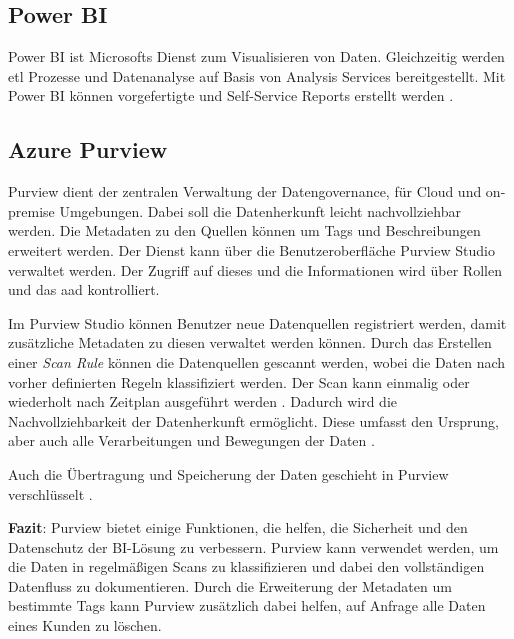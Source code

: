 \subsection{Power BI} \label{sec:grundlagen:azure_dienste:powerBI}
Power BI ist Microsofts Dienst zum Visualisieren von Daten. Gleichzeitig werden \ac{etl} Prozesse und Datenanalyse auf Basis von Analysis Services bereitgestellt. Mit Power BI können vorgefertigte und Self-Service Reports erstellt werden \cite{how_beyond_2020}.

\subsection{Azure Purview} \label{sec:grundlagen:azure_dienste:purview}
Purview dient der zentralen Verwaltung der Datengovernance, für Cloud und on-premise Umgebungen. Dabei soll die Datenherkunft leicht nachvollziehbar werden. Die Metadaten zu den Quellen können um Tags und Beschreibungen erweitert werden. Der Dienst kann über die Benutzeroberfläche Purview Studio verwaltet werden. Der Zugriff auf dieses und die Informationen wird über Rollen und das \ac{aad} kontrolliert.

Im Purview Studio können Benutzer neue Datenquellen registriert werden, damit zusätzliche Metadaten zu diesen verwaltet werden können. Durch das Erstellen einer \textit{Scan Rule} können die Datenquellen gescannt werden, wobei die Daten nach vorher definierten Regeln klassifiziert werden. Der Scan kann einmalig oder wiederholt nach Zeitplan ausgeführt werden \cite{lesteve_definitive_2021}. Dadurch wird die Nachvollziehbarkeit der Datenherkunft ermöglicht. Diese umfasst den Ursprung, aber auch alle Verarbeitungen und Bewegungen der Daten \cite{riscutia_data_2021}.

Auch die Übertragung und Speicherung der Daten geschieht in Purview verschlüsselt \cite{baldwin_azure_2021}. 

\textbf{Fazit}: Purview bietet einige Funktionen, die helfen, die Sicherheit und den Datenschutz der BI-Lösung zu verbessern. Purview kann verwendet werden, um die Daten in regelmäßigen Scans zu klassifizieren und dabei den vollständigen Datenfluss zu dokumentieren. Durch die Erweiterung der Metadaten um bestimmte Tags kann Purview zusätzlich dabei helfen, auf Anfrage alle Daten eines Kunden zu löschen.